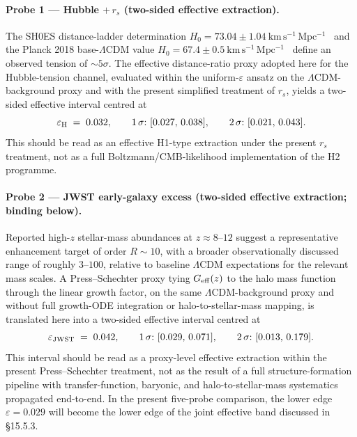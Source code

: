 \paragraph{Probe 1 --- Hubble $+\,r_s$ (two-sided effective extraction).}
The SH0ES distance-ladder determination
$H_0 = 73.04\pm1.04~\mathrm{km\,s^{-1}\,Mpc^{-1}}$~\cite{Riess2022}
and the Planck 2018 base-$\Lambda$CDM value
$H_0 = 67.4\pm0.5~\mathrm{km\,s^{-1}\,Mpc^{-1}}$~\cite{Planck2018}
define an observed tension of $\sim 5\sigma$.
The effective distance-ratio proxy adopted here for the Hubble-tension
channel, evaluated within the uniform-$\varepsilon$ ansatz on the
$\Lambda$CDM-background proxy and with the present simplified treatment
of $r_s$, yields a two-sided effective interval centred at
\begin{equation}
  \varepsilon_{\rm H} \;=\; 0.032,
  \qquad
  \text{1\,\ensuremath{\sigma}:}\ [0.027,\,0.038],
  \qquad
  \text{2\,\ensuremath{\sigma}:}\ [0.021,\,0.043].
  \label{eq:eps_hubble_retained}
\end{equation}
This should be read as an effective H1-type extraction under the
present $r_s$ treatment, not as a full Boltzmann/CMB-likelihood
implementation of the H2 programme.

\paragraph{Probe 2 --- JWST early-galaxy excess (two-sided effective extraction; binding below).}
Reported high-$z$ stellar-mass abundances at $z\approx 8$--$12$ suggest
a representative enhancement target of order $R \sim 10$, with a broader
observationally discussed range of roughly $3$--$100$, relative to
baseline $\Lambda$CDM expectations for the relevant mass scales. A
Press--Schechter proxy tying $G_{\rm eff}(z)$ to the halo mass function
through the linear growth factor, on the same $\Lambda$CDM-background
proxy and without full growth-ODE integration or halo-to-stellar-mass
mapping, is translated here into a two-sided effective interval centred at
\begin{equation}
  \varepsilon_{\rm JWST} \;=\; 0.042,
  \qquad
  \text{1\,\ensuremath{\sigma}:}\ [0.029,\,0.071],
  \qquad
  \text{2\,\ensuremath{\sigma}:}\ [0.013,\,0.179].
  \label{eq:eps_jwst_retained}
\end{equation}
This interval should be read as a proxy-level effective extraction
within the present Press--Schechter treatment, not as the result of a
full structure-formation pipeline with transfer-function, baryonic, and
halo-to-stellar-mass systematics propagated end-to-end. In the present
five-probe comparison, the lower edge $\varepsilon = 0.029$ will
become the lower edge of the joint effective band discussed in
\S15.5.3.

